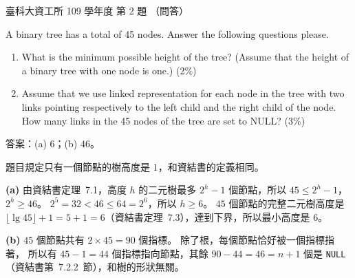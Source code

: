 \begin{pastexam}[label={px:ntust-109-ice-02}]{臺科大資工所 109 學年度 第 2 題}
（問答）

A binary tree has a total of 45 nodes. Answer the following questions please.
\begin{enumerate}[label=(\alph*)]
\item What is the minimum possible height of the tree? (Assume that the height of a binary tree
with one node is one.) (2\%)
\item Assume that we use linked representation for each node in the tree with two links pointing
respectively to the left child and the right child of the node. How many links in the 45 nodes of
the tree are set to NULL? (3\%)
\end{enumerate}
\end{pastexam}

\begin{pastsoln}
答案：(a) $6$；(b) $46$。

題目規定只有一個節點的樹高度是 $1$，和資結書的定義相同。

\textbf{(a)} 由資結書定理~7.1，高度 $h$ 的二元樹最多 $2^h - 1$ 個節點，所以 $45 \le 2^h - 1$，
$2^h \ge 46$。 $2^5 = 32 < 46 \le 64 = 2^6$，所以 $h \ge 6$。 $45$ 個節點的完整二元樹高度是
$\lfloor \lg 45 \rfloor + 1 = 5 + 1 = 6$（資結書定理~7.3），達到下界，所以最小高度是 $6$。

\textbf{(b)} $45$ 個節點共有 $2 \times 45 = 90$ 個指標。 除了根，每個節點恰好被一個指標指著，
所以有 $45 - 1 = 44$ 個指標指向節點，其餘 $90 - 44 = 46 = n + 1$ 個是 \texttt{NULL}
（資結書第~7.2.2~節），和樹的形狀無關。
\end{pastsoln}
